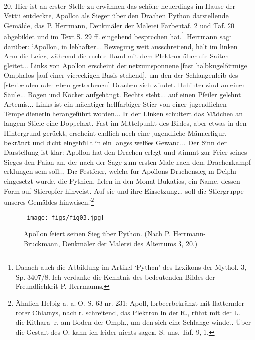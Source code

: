 \documentclass[a4paper, 11pt, oneside]{article}
\begin{document}
\paragraph{}
20. Hier ist an erster Stelle zu erwähnen das schöne neuerdings im Hause der Vettii entdeckte, Apollon als Sieger über den Drachen Python darstellende Gemälde, das P. Herrmann, Denkmäler der Malerei Farbentaf. 2 und Taf. 20 abgebildet und im Text S. 29 ff. eingehend besprochen hat.\footnote{Danach auch die Abbildung im Artikel `Python' des Lexikons der Mythol. 3, Sp. 3407/8. Ich verdanke die Kenntnis des bedeutenden Bildes der Freundlichkeit P. Herrmanns.} Herrmann sagt darüber: `Apollon, in lebhafter... Bewegung weit ausschreitend, hält im linken Arm die Leier, während die rechte Hand mit dem Plektron über die Saiten gleitet... Links von Apollon erscheint der netzumsponnene [fast halbkugelförmige] Omphalos [auf einer viereckigen Basis stehend], um den der Schlangenleib des [sterbenden oder eben gestorbenen] Drachen sich windet. Dahinter sind an einer Säule... Bogen und Köcher aufgehängt. Rechts steht... auf einen Pfeiler gelehnt Artemis... Links ist ein mächtiger hellfarbiger Stier von einer jugendlichen Tempeldienerin herangeführt worden... In der Linken schultert das Mädchen an langem Stiele eine Doppelaxt. Fast im Mittelpunkt des Bildes, aber etwas in den Hintergrund gerückt, erscheint endlich noch eine jugendliche Männerfigur, bekränzt und dicht eingehüllt in ein langes weißes Gewand... Der Sinn der Darstellung ist klar: Apollon hat den Drachen erlegt und stimmt zur Feier seines Sieges den Paian an, der nach der Sage zum ersten Male nach dem Drachenkampf erklungen sein soll... Die Festfeier, welche für Apollons Drachensieg in Delphi eingesetzt wurde, die Pythien, fielen in den Monat Bukatios, ein Name, dessen Form auf Stieropfer hinweist. Auf sie und ihre Einsetzung... soll die Stiergruppe unseres Gemäldes hinweisen.'\footnote{Ähnlich Helbig a. a. O. S. 63 nr. 231: Apoll, lorbeerbekränzt mit flatternder roter Chlamys, nach r. schreitend, das Plektron in der R., rührt mit der L. die Kithara; r. am Boden der Omph., um den sich eine Schlange windet. Über die Gestalt des O. kann ich leider nichts sagen. S. uns. Taf. 9, 1.}

\begin{figure}[H]
\centering
\texttt{[image: figs/fig03.jpg]}
\caption*{\frakfamily Apollon feiert seinen Sieg über Python. (Nach P. Herrmann-Bruckmann, Denkmäler der Malerei des Altertums 3, 20.)}
\end{figure}
\end{document}
